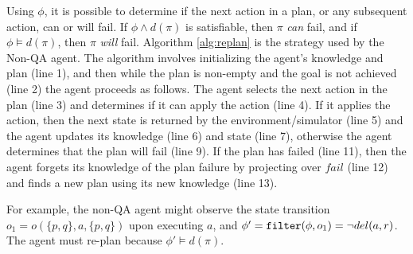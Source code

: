 \documentclass{article}
\def\goalie{{\tt Goalie}}
\begin{document}
Using $\phi$, it is possible to determine if the next action in a plan, or any
subsequent action, can or will fail.  If  $\phi \wedge d(\pi)$ is
satisfiable, then $\pi$ {\em can} fail, and if $\phi \models d(\pi)$,
then $\pi$ {\em will}  fail.  
Algorithm \ref{alg:replan} is the strategy used by the Non-QA agent.  The
algorithm involves initializing the agent's knowledge and plan (line 1), and then while
the plan is non-empty and the goal is not achieved (line 2) the agent proceeds
as follows.  The agent selects the next action in the plan (line 3) and
determines if it can apply the action (line 4).  If it applies the action, then
the next state is returned by the environment/simulator (line 5) and the agent
updates its knowledge (line 6) and state (line 7),
otherwise the agent determines that the plan will fail (line 9).  If the plan
has failed (line 11), then the agent forgets its knowledge of the plan failure
by projecting over $fail$ (line 12) and finds a new plan using its new knowledge
(line 13).

For example, the non-QA agent might observe the state transition $o_1
= o(\{p,q\}, a, \{p,q\})$ upon executing $a$, and $\phi' = {\tt filter}(\phi,
o_1) = \neg del(a, r)$.  The agent must re-plan because $\phi' \models d(\pi)$.

\end{document}
